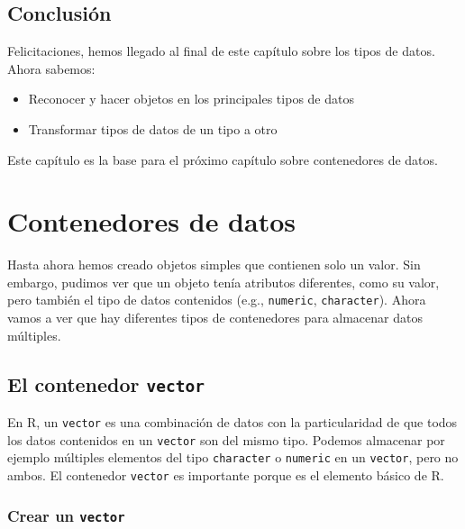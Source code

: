 \documentclass[
]{book}
\providecommand{\tightlist}{%
  \setlength{\itemsep}{0pt}\setlength{\parskip}{0pt}}
\begin{document}
\hypertarget{conclusiuxf3n-2}{%
\section{Conclusión}\label{conclusiuxf3n-2}}

Felicitaciones, hemos llegado al final de este capítulo sobre los tipos de datos. Ahora sabemos:

\begin{itemize}
\tightlist
\item
  Reconocer y hacer objetos en los principales tipos de datos
\item
  Transformar tipos de datos de un tipo a otro
\end{itemize}

Este capítulo es la base para el próximo capítulo sobre contenedores de datos.

\hypertarget{dataType2}{%
\chapter{Contenedores de datos}\label{dataType2}}

Hasta ahora hemos creado objetos simples que contienen solo un valor. Sin embargo, pudimos ver que un objeto tenía atributos diferentes, como su valor, pero también el tipo de datos contenidos (e.g., \texttt{numeric}, \texttt{character}). Ahora vamos a ver que hay diferentes tipos de contenedores para almacenar datos múltiples.

\hypertarget{l014vector}{%
\section{\texorpdfstring{El contenedor \texttt{vector}}{El contenedor vector}}\label{l014vector}}

En R, un \texttt{vector} es una combinación de datos con la particularidad de que todos los datos contenidos en un \texttt{vector} son del mismo tipo. Podemos almacenar por ejemplo múltiples elementos del tipo \texttt{character} o \texttt{numeric} en un \texttt{vector}, pero no ambos. El contenedor \texttt{vector} es importante porque es el elemento básico de R.

\hypertarget{crear-un-vector}{%
\subsection{\texorpdfstring{Crear un \texttt{vector}}{Crear un vector}}\label{crear-un-vector}}
\end{document}
